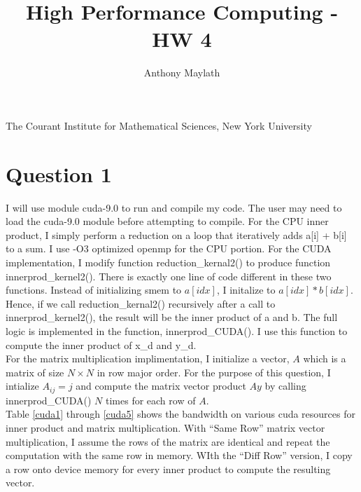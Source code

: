 \documentclass[12pt]{article}
\title{High Performance Computing - HW 4}
\author{Anthony Maylath}
\begin{document}
\maketitle

\begin{center}

The Courant Institute for Mathematical Sciences, New York University \\ 

\end{center}


\setcounter{MaxMatrixCols}{13}

\section{Question 1}

I will use module cuda-9.0 to run and compile my code. The user may need to load the cuda-9.0 module before attempting to compile. For the CPU inner product, I simply perform a reduction on a loop that iteratively adds a[i] + b[i] to a sum. I use -O3 optimized openmp for the CPU portion. For the CUDA implementation, I modify function reduction\_kernal2() to produce function innerprod\_kernel2(). There is exactly one line of code different in these two functions. Instead of initializing smem to $a[idx]$, I initalize to $a[idx] * b[idx]$. Hence, if we call reduction\_kernal2() recursively after a call to innerprod\_kernel2(), the result will be the inner product of a and b. The full logic is implemented in the function, innerprod\_CUDA(). I use this function to compute the inner product of x\_d and y\_d.\\

For the matrix multiplication implimentation, I initialize a vector, $A$ which is a matrix of size $N \times N$ in row major order. For the purpose of this question, I intialize $A_{ij} = j$ and compute the matrix vector product $Ay$ by calling innerprod\_CUDA() $N$ times for each row of $A$.\\

Table \ref{cuda1} through \ref{cuda5} shows the bandwidth on various cuda resources for inner product and matrix multiplication. With ``Same Row'' matrix vector multiplication, I assume the rows of the matrix are identical and repeat the computation with the same row in memory. WIth the ``Diff Row'' version, I copy a row onto device memory for every inner product to compute the resulting vector.\\
\end{document}
